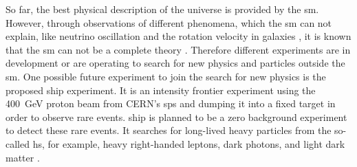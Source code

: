 So far, the best physical description of the universe is provided by the \ac{sm}.
However, through observations of different phenomena, which the \ac{sm} can not explain, like neutrino oscillation \cite{} and the rotation velocity in galaxies \cite{}, it is known that the \ac{sm} can not be a complete theory \cite{}.
Therefore different experiments are in development or are operating to search for new physics and particles outside the \ac{sm}.
One possible future experiment to join the search for new physics is the proposed \ac{ship} experiment.
It is an intensity frontier experiment using the \SI{400}{\giga\electronvolt} proton beam from CERN's \ac{sps} and dumping it into a fixed target in order to observe rare events.
\ac{ship} is planned to be a zero background experiment to detect these rare events.
It searches for long-lived heavy particles from the so-called \ac{hs}, for example, heavy right-handed leptons, dark photons, and light dark matter \cite{}.


